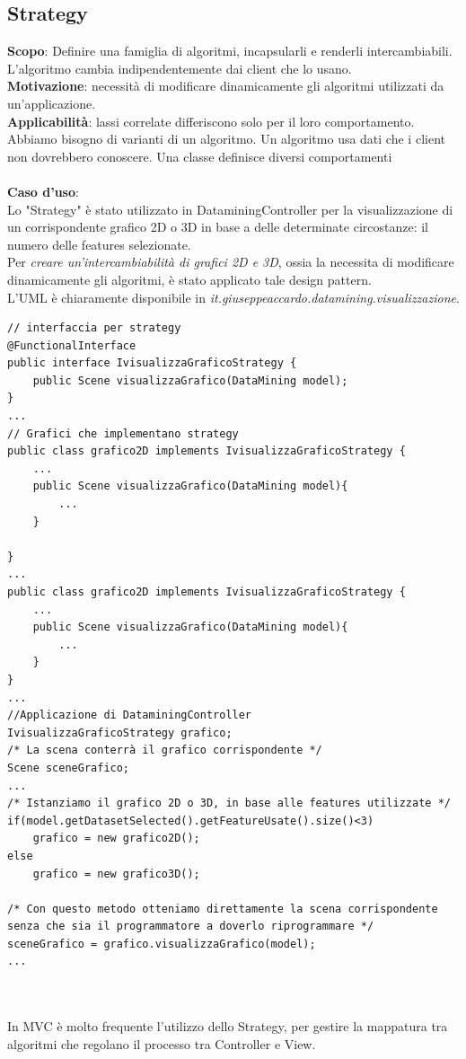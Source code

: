 \documentclass[a4paper, oneside]{book}
\begin{document}
\subsection*{Strategy}
\textbf{Scopo}: Definire una famiglia di algoritmi, incapsularli e renderli intercambiabili. L'algoritmo cambia
indipendentemente dai client che lo usano.
\\
\textbf{Motivazione}: necessità di modificare dinamicamente gli algoritmi utilizzati da un'applicazione.
\\
\textbf{Applicabilità}:  lassi correlate differiscono solo per il loro comportamento. Abbiamo bisogno di
varianti di un algoritmo. Un algoritmo usa dati che i client non dovrebbero conoscere. Una classe definisce diversi comportamenti
\\
\\
\textbf{Caso d'uso}: 
\\
Lo "Strategy" è stato utilizzato in DataminingController per la visualizzazione di un corrispondente grafico 2D o 3D in base a delle determinate circostanze: il numero delle features selezionate. \\
Per \textit{creare un'intercambiabilità di grafici 2D e 3D}, ossia la necessita di modificare dinamicamente gli algoritmi, è stato applicato tale design pattern. \\L'UML è chiaramente disponibile in \textit{it.giuseppeaccardo.datamining.visualizzazione}.
\\

\begin{lstlisting}
// interfaccia per strategy
@FunctionalInterface
public interface IvisualizzaGraficoStrategy {
	public Scene visualizzaGrafico(DataMining model);
}
...
// Grafici che implementano strategy
public class grafico2D implements IvisualizzaGraficoStrategy {
    ...
    public Scene visualizzaGrafico(DataMining model){
        ...
    }

}
...
public class grafico2D implements IvisualizzaGraficoStrategy {
    ...
    public Scene visualizzaGrafico(DataMining model){
        ...
    }
}
...
//Applicazione di DataminingController
IvisualizzaGraficoStrategy grafico;
/* La scena conterrà il grafico corrispondente */
Scene sceneGrafico;
...
/* Istanziamo il grafico 2D o 3D, in base alle features utilizzate */
if(model.getDatasetSelected().getFeatureUsate().size()<3)
    grafico = new grafico2D();
else
	grafico = new grafico3D();
	
/* Con questo metodo otteniamo direttamente la scena corrispondente senza che sia il programmatore a doverlo riprogrammare */
sceneGrafico = grafico.visualizzaGrafico(model);
...    	
\end{lstlisting}
\\
\\
In MVC è molto frequente l'utilizzo dello Strategy, per gestire la mappatura tra algoritmi che regolano il processo tra Controller e View. 
\end{document}
